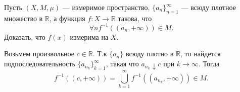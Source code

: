 \begin{task}{4}
Пусть $(X, M, \mu)$ --- измеримое пространство, $\{a_n\}_{n=1}^{\infty}$ --- всюду плотное множество в $\mathbb{R}$, а функция $f: X \rightarrow \mathbb{R}$ такова, что
$$ \forall n f^{-1}((a_n, +\infty)) \in M.$$
Доказать, что $f(x)$ измерима на $X$.
\end{task}

\begin{solution}
Возьмем произвольное $c \in \mathbb{R}$. Т.к $\{a_n\}$ всюду плотно в $\mathbb{R}$, то найдется подпоследовательность $\{a_{n_k}\}_{k=1}^{\infty}$, такая что $a_{n_k} \downarrow c$ при $k \to \infty$. Тогда
$$ f^{-1}((c, +\infty)) = \bigcup_{k=1}^{\infty} f^{-1}((a_{n_k}, +\infty)) \in M.$$
\end{solution}